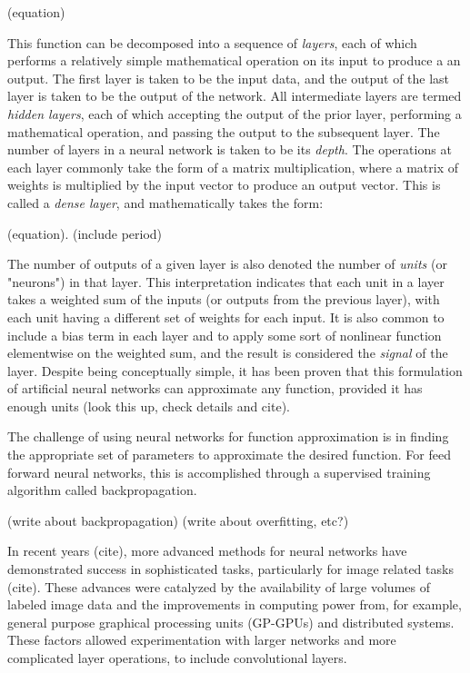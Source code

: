 (equation)

This function can be decomposed into a sequence of \textit{layers}, each of which performs a relatively simple mathematical operation on its input to produce a an output.
The first layer is taken to be the input data, and the output of the last layer is taken to be the output of the network. 
All intermediate layers are termed \textit{hidden layers}, each of which accepting the output of the prior layer, performing a mathematical operation, and passing the output to the subsequent layer.
The number of layers in a neural network is taken to be its \textit{depth}.
The operations at each layer commonly take the form of a matrix multiplication, where a matrix of weights is multiplied by the input vector to produce an output vector.
This is called a \textit{dense layer}, and mathematically takes the form:

(equation). (include period)

The number of outputs of a given layer is also denoted the number of \textit{units} (or "neurons") in that layer.
This interpretation indicates that each unit in a layer takes a weighted sum of the inputs (or outputs from the previous layer), with each unit having a different set of weights for each input. 
It is also common to include a bias term in each layer and to apply some sort of nonlinear function elementwise on the weighted sum, and the result is considered the \textit{signal} of the layer.
Despite being conceptually simple, it has been proven that this formulation of artificial neural networks can approximate any function, provided it has enough units (look this up, check details and cite).

The challenge of using neural networks for function approximation is in finding the appropriate set of parameters to approximate the desired function. 
For feed forward neural networks, this is accomplished through a supervised training algorithm called backpropagation. 

(write about backpropagation)
(write about overfitting, etc?)

In recent years (cite), more advanced methods for neural networks have demonstrated success in sophisticated tasks, particularly for image related tasks (cite). 
These advances were catalyzed by the availability of large volumes of labeled image data and the improvements in computing power from, for example, general purpose graphical processing units (GP-GPUs) and distributed systems.
These factors allowed experimentation with larger networks and more complicated layer operations, to include convolutional layers.

